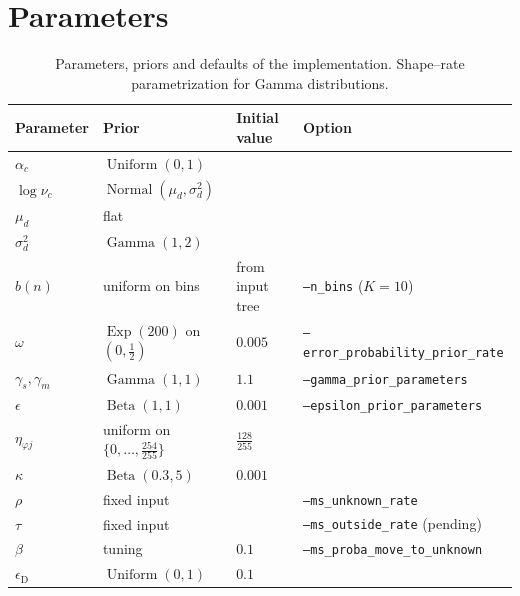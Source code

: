 \documentclass[
11pt, %
oneside, %
english, %
singlespacing, %
headsepline, %
chapterinoneline, %
]{MastersDoctoralThesis} %
\DeclareMathOperator{\Unif}{Uniform}
\DeclareMathOperator{\Normal}{Normal}
\DeclareMathOperator{\GammaDist}{Gamma}
\DeclareMathOperator{\BetaDist}{Beta}
\DeclareMathOperator{\Exponential}{Exp}
\begin{document}
\section{Parameters}

\begin{table}[h]
	\centering
	\small
	\begin{tabular}{@{}llll@{}}
		\toprule
		Parameter & Prior & Initial value & Option \\
		\midrule
		$\alpha_c$ & $\Unif(0,1)$ & & \\
		$\log \nu_c$ & $\Normal(\mu_d, \sigma^2_d)$ & & \\
		$\mu_d$ & flat & & \\
		$\sigma^2_d$ & $\GammaDist(1,2)$ & & \\
		$b(n)$ & uniform on bins & from input tree & \texttt{--n\_bins} ($K=10$) \\
		$\omega$ & $\Exponential(200)$ on $(0,\tfrac12)$ & $0.005$ & \texttt{--error\_probability\_prior\_rate} \\
		$\gamma_s, \gamma_m$ & $\GammaDist(1,1)$ & $1.1$ & \texttt{--gamma\_prior\_parameters} \\
		$\epsilon$ & $\BetaDist(1,1)$ & $0.001$ & \texttt{--epsilon\_prior\_parameters} \\
		$\eta_{\varphi j}$ & uniform on $\{0, \ldots, \tfrac{254}{255}\}$ & $\tfrac{128}{255}$ & \\
		$\kappa$ & $\BetaDist(0.3, 5)$ & $0.001$ & \\
		$\rho$ & fixed input & & \texttt{--ms\_unknown\_rate} \\
		$\tau$ & fixed input & & \texttt{--ms\_outside\_rate} (pending) \\
		$\beta$ & tuning & $0.1$ & \texttt{--ms\_proba\_move\_to\_unknown} \\
		$\epsilon_{\mathrm{D}}$ & $\Unif(0,1)$ & $0.1$ & \\
		\bottomrule
	\end{tabular}
	\caption{Parameters, priors and defaults of the implementation. Shape--rate parametrization for Gamma distributions.}
	\label{tab:parameters}
\end{table}

\renewcommand{\bibname}{References}




\end{document}
